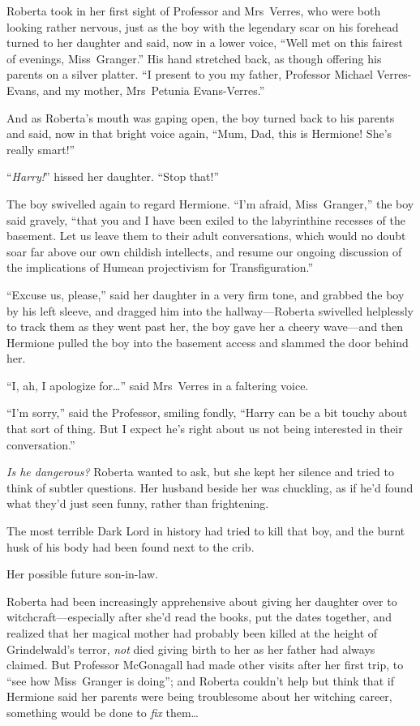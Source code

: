 Roberta took in her first sight of Professor and Mrs~Verres, who were both looking rather nervous, just as the boy with the legendary scar on his forehead turned to her daughter and said, now in a lower voice, “Well met on this fairest of evenings, Miss~Granger.” His hand stretched back, as though offering his parents on a silver platter. “I present to you my father, Professor Michael Verres-Evans, and my mother, Mrs~Petunia Evans-Verres.”

And as Roberta’s mouth was gaping open, the boy turned back to his parents and said, now in that bright voice again, “Mum, Dad, this is Hermione! She’s really smart!”

“\emph{Harry!}” hissed her daughter. “Stop that!”

The boy swivelled again to regard Hermione. “I’m afraid, Miss~Granger,” the boy said gravely, “that you and I have been exiled to the labyrinthine recesses of the basement. Let us leave them to their adult conversations, which would no doubt soar far above our own childish intellects, and resume our ongoing discussion of the implications of Humean projectivism for Transfiguration.”

“Excuse us, please,” said her daughter in a very firm tone, and grabbed the boy by his left sleeve, and dragged him into the hallway—Roberta swivelled helplessly to track them as they went past her, the boy gave her a cheery wave—and then Hermione pulled the boy into the basement access and slammed the door behind her.

“I, ah, I apologize for…” said Mrs~Verres in a faltering voice.

“I’m sorry,” said the Professor, smiling fondly, “Harry can be a bit touchy about that sort of thing. But I expect he’s right about us not being interested in their conversation.”

\emph{Is he dangerous?} Roberta wanted to ask, but she kept her silence and tried to think of subtler questions. Her husband beside her was chuckling, as if he’d found what they’d just seen funny, rather than frightening.

The most terrible Dark Lord in history had tried to kill that boy, and the burnt husk of his body had been found next to the crib.

Her possible future son-in-law.

Roberta had been increasingly apprehensive about giving her daughter over to witchcraft—especially after she’d read the books, put the dates together, and realized that her magical mother had probably been killed at the height of Grindelwald’s terror, \emph{not} died giving birth to her as her father had always claimed. But Professor McGonagall had made other visits after her first trip, to “see how Miss~Granger is doing”; and Roberta couldn’t help but think that if Hermione said her parents were being troublesome about her witching career, something would be done to \emph{fix} them…

